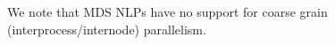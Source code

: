 \documentclass[11pt]{article}
\newcounter{line}
\begin{document}
We note that MDS NLPs have no support for coarse grain (interprocess/internode) parallelism.


\medskip
\end{document}
